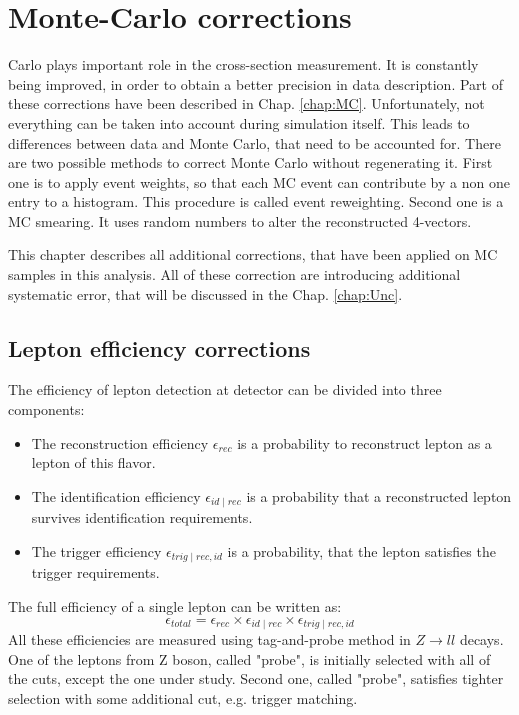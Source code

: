 \chapter{Monte-Carlo corrections}\label{chap:MCCor}
\minitomWmineMonte Carlo plays important role in the cross-section measurement. It is constantly being improved, in order to obtain a better precision in data description. Part of these corrections have been described in Chap. \ref{chap:MC}. Unfortunately, not everything can be taken into account during simulation itself. This leads to differences between data and Monte Carlo, that need to be accounted for. There are two possible methods to correct Monte Carlo without regenerating it. First one is to apply event weights, so that each MC event can contribute by a non one entry to a histogram. This procedure is called event reweighting. Second one is a MC smearing. It uses random numbers to alter the reconstructed 4-vectors. 

This chapter describes all additional corrections, that have been applied on MC samples in this analysis. All of these correction are introducing additional systematic error, that will be discussed in the Chap. \ref{chap:Unc}.

\section{Lepton efficiency corrections}\label{sec:Eff}

The efficiency of lepton detection at \atlas detector can be divided into three components:
\begin{itemize}
\item The reconstruction efficiency $\epsilon_{rec}$ is a probability to reconstruct lepton as a lepton of this flavor.
\item The identification efficiency $\epsilon_{id \mid rec}$ is a probability that a reconstructed lepton survives  identification requirements. 
\item The trigger efficiency $\epsilon_{trig \mid rec,id}$ is a probability, that the lepton satisfies the trigger requirements. 
\end{itemize}

The full efficiency of a single lepton can be written as:
\begin{equation}
\epsilon_{total}=\epsilon_{rec} \times \epsilon_{id \mid rec} \times \epsilon_{trig \mid rec,id}
\end{equation}
All these efficiencies are measured using tag-and-probe method in $Z\to ll$ decays.  One of the leptons from Z boson, called "probe", is initially selected with all of the cuts, except the one under study. Second one, called "probe", satisfies tighter selection with some additional cut, e.g. trigger matching.

